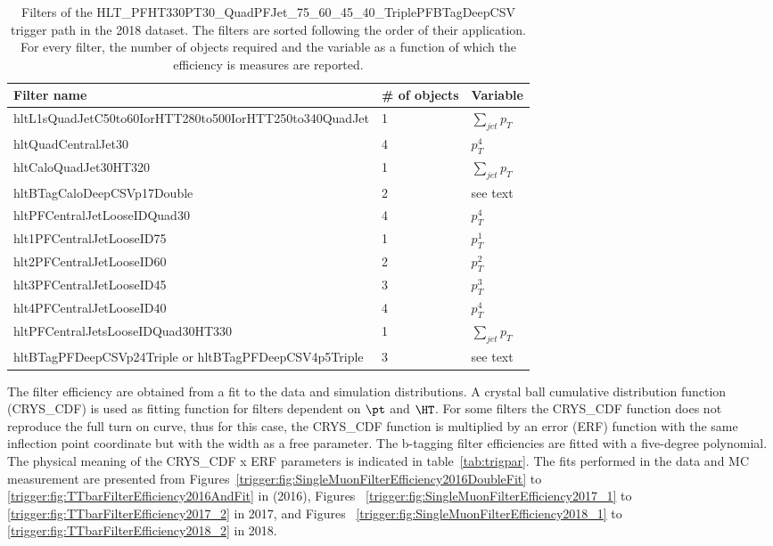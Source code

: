 \begin{table}[htb]
\caption[Filters of the HLT\_PFHT330PT30\_QuadPFJet\_75\_60\_45\_40\_TriplePFBTagDeepCSV trigger path in the 2018 dataset]{\label{trigger:tab:filters2018}Filters of the HLT\_PFHT330PT30\_QuadPFJet\_75\_60\_45\_40\_TriplePFBTagDeepCSV trigger path in the 2018 dataset. The filters are sorted following the order of their application. For every filter, the number of objects required and the variable as a function of which the efficiency is measures are reported.}
\centering
\begin{tabularx}{\textwidth}{lXX}
    \hline
    \small Filter name &\small \# of objects    &\small Variable  \\
    \hline
    \small hltL1sQuadJetC50to60IorHTT280to500IorHTT250to340QuadJet &\small 1 &\small $\sum_{jet} p_T$ \\
    \small hltQuadCentralJet30 &\small 4 &\small $p_T^4$ \\ 
    \small hltCaloQuadJet30HT320 &\small 1 &\small $\sum_{jet} p_T$ \\
    \small hltBTagCaloDeepCSVp17Double &\small 2 &\small see text \\ 
    \small hltPFCentralJetLooseIDQuad30 &\small 4 &\small $p_T^4$ \\ 
    \small hlt1PFCentralJetLooseID75 &\small 1 &\small $p_T^1$ \\ 
    \small hlt2PFCentralJetLooseID60 &\small 2 &\small $p_T^2$ \\ 
    \small hlt3PFCentralJetLooseID45 &\small 3 &\small $p_T^3$ \\ 
    \small hlt4PFCentralJetLooseID40 &\small 4 &\small $p_T^4$ \\ 
    \small hltPFCentralJetsLooseIDQuad30HT330 &\small 1 &\small $\sum_{jet} p_T$ \\
    \small hltBTagPFDeepCSVp24Triple or hltBTagPFDeepCSV4p5Triple &\small 3 &\small see text \\ 
    \hline
\end{tabularx}
\end{table}



The filter efficiency are obtained from a fit to the data and simulation distributions. A crystal ball cumulative distribution function (CRYS\_CDF) is used as fitting function for filters dependent on $\pt$ and $\HT$. For some filters the CRYS\_CDF function does not reproduce the full turn on curve, thus for this case, the CRYS\_CDF function is multiplied by an error (ERF) function with the same inflection point coordinate but with the width as a free parameter. The b-tagging filter efficiencies are fitted with a five-degree polynomial. The physical meaning of the CRYS\_CDF x ERF parameters is indicated in table~\ref{tab:trigpar}. The fits performed in the data and MC measurement are presented from Figures~\ref{trigger:fig:SingleMuonFilterEfficiency2016DoubleFit} to \ref{trigger:fig:TTbarFilterEfficiency2016AndFit} in (2016), Figures ~\ref{trigger:fig:SingleMuonFilterEfficiency2017_1} to \ref{trigger:fig:TTbarFilterEfficiency2017_2} in 2017, and Figures ~\ref{trigger:fig:SingleMuonFilterEfficiency2018_1} to \ref{trigger:fig:TTbarFilterEfficiency2018_2} in 2018.

